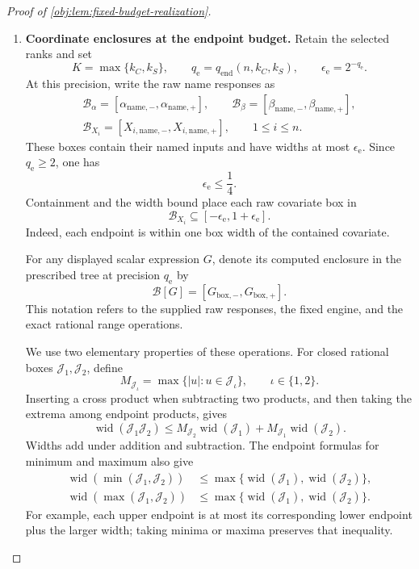\documentclass[11pt]{article}
\begin{document}
\begin{proof}[Proof of \cref{obj:lem:fixed-budget-realization}]
\begin{enumerate}
\item \textbf{Coordinate enclosures at the endpoint budget.}
Retain the selected ranks and set
\[
K=\max\{k_C,k_S\},
\qquad
q_{\mathrm e}=q_{\mathrm{end}}(n,k_C,k_S),
\qquad
\epsilon_{\mathrm e}=2^{-q_{\mathrm e}}.
\]
At this precision, write the raw name responses as
\[
\begin{gathered}
\mathcal B_\alpha
=[\alpha_{\mathrm{name},-},\alpha_{\mathrm{name},+}],
\qquad
\mathcal B_\beta
=[\beta_{\mathrm{name},-},\beta_{\mathrm{name},+}],\\
\mathcal B_{X_i}
=[X_{i,\mathrm{name},-},X_{i,\mathrm{name},+}],
\qquad 1\le i\le n.
\end{gathered}
\]
These boxes contain their named inputs and have widths at most \(\epsilon_{\mathrm e}\). Since \(q_{\mathrm e}\ge2\), one has
\[
\epsilon_{\mathrm e}\le\frac14.
\]
Containment and the width bound place each raw covariate box in
\[
\mathcal B_{X_i}\subseteq[-\epsilon_{\mathrm e},1+\epsilon_{\mathrm e}].
\]
Indeed, each endpoint is within one box width of the contained covariate.

For any displayed scalar expression \(G\), denote its computed enclosure in the prescribed tree at precision \(q_{\mathrm e}\) by
\[
\mathcal B[G]=[G_{\mathrm{box},-},G_{\mathrm{box},+}].
\]
This notation refers to the supplied raw responses, the fixed engine, and the exact rational range operations.

We use two elementary properties of these operations. For closed rational boxes \(\mathcal J_1,\mathcal J_2\), define
\[
M_{\mathcal J_\iota}
=\max\{|u|:u\in\mathcal J_\iota\},
\qquad \iota\in\{1,2\}.
\]
Inserting a cross product when subtracting two products, and then taking the extrema among endpoint products, gives
\[
\operatorname{wid}(\mathcal J_1\mathcal J_2)
\le
M_{\mathcal J_2}\operatorname{wid}(\mathcal J_1)
+
M_{\mathcal J_1}\operatorname{wid}(\mathcal J_2).
\]
Widths add under addition and subtraction. The endpoint formulas for minimum and maximum also give
\[
\begin{aligned}
\operatorname{wid}(\min(\mathcal J_1,\mathcal J_2))
&\le\max\{\operatorname{wid}(\mathcal J_1),
          \operatorname{wid}(\mathcal J_2)\},\\
\operatorname{wid}(\max(\mathcal J_1,\mathcal J_2))
&\le\max\{\operatorname{wid}(\mathcal J_1),
          \operatorname{wid}(\mathcal J_2)\}.
\end{aligned}
\]
For example, each upper endpoint is at most its corresponding lower endpoint plus the larger width; taking minima or maxima preserves that inequality.


\end{enumerate}
\end{proof}
\end{document}
